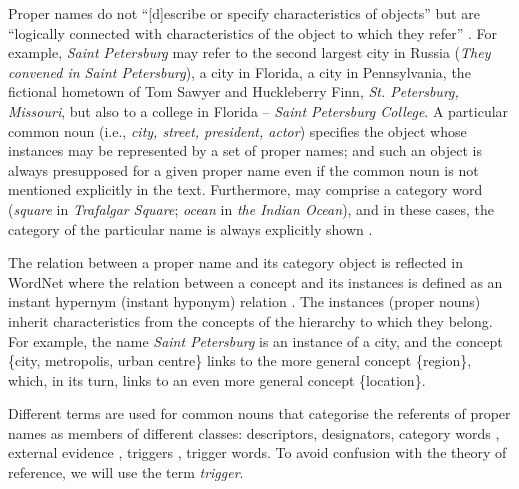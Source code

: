 \documentclass[output=paper]{langsci/langscibook}
\begin{document}
Proper names do not “[d]escribe or specify characteristics of objects” but
are “logically connected with characteristics of the object to which
they refer” \citep[173]{searle1958}. For example, \textit{Saint Petersburg}
may refer to the second largest city in Russia (\textit{They convened
in Saint Petersburg}), a city in Florida, a city in Pennsylvania, the
fictional hometown of Tom Sawyer and Huckleberry Finn, \textit{St.
Petersburg, Missouri}, but also to a college in Florida – \textit{Saint
Petersburg College}. A particular common noun (i.e., \textit{city,
street, president, actor}) specifies the object whose instances may be
represented by a set of proper names; and such an object is always
presupposed for a given proper name even if the common noun is not
mentioned explicitly in the text. Furthermore,  may
comprise a category word (\textit{square} in \textit{Trafalgar Square};
\textit{ocean} in \textit{the Indian Ocean}), and in these cases, the
category of the particular name is always explicitly shown \citep[144]{carroll1985}.




The relation between a proper name and its category object is reflected
in WordNet where the relation between a concept and its instances is
defined as an instant hypernym (instant hyponym) relation
\citep{rodriguez1998}. The
instances (proper nouns) inherit characteristics from the concepts of
the hierarchy to which they belong. For example, the name \textit{Saint
Petersburg} is an instance of a city, and the concept \{city,
metropolis, urban centre\} links to the more general concept
\{region\}, which, in its turn, links to an even more general concept
\{location\}.



Different terms are used for common nouns that categorise the referents
of proper names as members of different classes: descriptors,
designators, category words \citep{carroll1985}, external evidence \citep{mcdonald1996}, triggers \citep{magnini2002}, trigger words. To avoid
confusion with the theory of reference, we will use the term \textit{trigger}.
\end{document}
